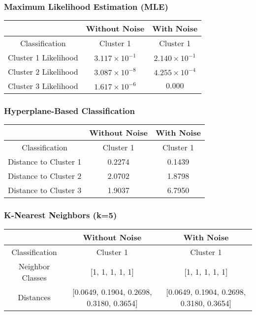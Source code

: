 \documentclass[12pt]{article}
\begin{document}
\subsubsection{Maximum Likelihood Estimation (MLE)}
\begin{table}[H]
    \centering
    \begin{tabular}{|c|c|c|}
        \hline
        & \textbf{Without Noise} & \textbf{With Noise} \\
        \hline
        Classification & Cluster 1 & Cluster 1 \\
        \hline
        Cluster 1 Likelihood & \(3.117 \times 10^{-1}\) & \(2.140 \times 10^{-1}\) \\
        \hline
        Cluster 2 Likelihood & \(3.087 \times 10^{-8}\) & \(4.255 \times 10^{-4}\) \\
        \hline
        Cluster 3 Likelihood & \(1.617 \times 10^{-6}\) & \(0.000\) \\
        \hline
    \end{tabular}
\end{table}

\subsubsection{Hyperplane-Based Classification}
\begin{table}[H]
    \centering
    \begin{tabular}{|c|c|c|}
        \hline
        & \textbf{Without Noise} & \textbf{With Noise} \\
        \hline
        Classification & Cluster 1 & Cluster 1 \\
        \hline
        Distance to Cluster 1 & 0.2274 & 0.1439 \\
        \hline
        Distance to Cluster 2 & 2.0702 & 1.8798 \\
        \hline
        Distance to Cluster 3 & 1.9037 & 6.7950 \\
        \hline
    \end{tabular}
\end{table}

\subsubsection{K-Nearest Neighbors (k=5)}
\begin{table}[H]
    \centering
    \begin{tabular}{|c|c|c|}
        \hline
        & \textbf{Without Noise} & \textbf{With Noise} \\
        \hline
        Classification & Cluster 1 & Cluster 1 \\
        \hline
        Neighbor Classes & [1, 1, 1, 1, 1] & [1, 1, 1, 1, 1] \\
        \hline
        Distances & [0.0649, 0.1904, 0.2698, 0.3180, 0.3654] & [0.0649, 0.1904, 0.2698, 0.3180, 0.3654] \\
        \hline
    \end{tabular}
\end{table}
\end{document}
